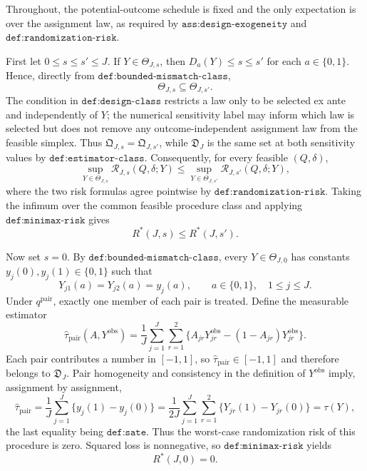 Throughout, the potential-outcome schedule is fixed and the only expectation is over the assignment law, as required by \(\texttt{ass:design-exogeneity}\) and \(\texttt{def:randomization-risk}\).

First let \(0\le s\le s'\le J\).  If \(Y\in\Theta_{J,s}\), then \(D_a(Y)\le s\le s'\) for each \(a\in\{0,1\}\).  Hence, directly from \(\texttt{def:bounded-mismatch-class}\),
\[
 \Theta_{J,s}\subseteq\Theta_{J,s'}.
\]
The condition in \(\texttt{def:design-class}\) restricts a law only to be selected ex ante and independently of \(Y\); the numerical sensitivity label may inform which law is selected but does not remove any outcome-independent assignment law from the feasible simplex.  Thus \(\mathfrak Q_{J,s}=\mathfrak Q_{J,s'}\), while \(\mathfrak D_J\) is the same set at both sensitivity values by \(\texttt{def:estimator-class}\).  Consequently, for every feasible \((Q,\delta)\),
\[
 \sup_{Y\in\Theta_{J,s}}\mathcal R_{J,s}(Q,\delta;Y)
 \le
 \sup_{Y\in\Theta_{J,s'}}\mathcal R_{J,s'}(Q,\delta;Y),
\]
where the two risk formulas agree pointwise by \(\texttt{def:randomization-risk}\).  Taking the infimum over the common feasible procedure class and applying \(\texttt{def:minimax-risk}\) gives
\[
 R^*(J,s)\le R^*(J,s').
\]

Now set \(s=0\).  By \(\texttt{def:bounded-mismatch-class}\), every \(Y\in\Theta_{J,0}\) has constants \(y_j(0),y_j(1)\in\{0,1\}\) such that
\[
 Y_{j1}(a)=Y_{j2}(a)=y_j(a),
 \qquad a\in\{0,1\},\quad 1\le j\le J.
\]
Under \(q^{\mathrm{pair}}\), exactly one member of each pair is treated.  Define the measurable estimator
\[
 \widehat\tau_{\mathrm{pair}}(A,Y^{\mathrm{obs}})
 =\frac1J\sum_{j=1}^J\sum_{r=1}^2
 \bigl\{A_{jr}Y^{\mathrm{obs}}_{jr}-(1-A_{jr})Y^{\mathrm{obs}}_{jr}\bigr\}.
\]
Each pair contributes a number in \([-1,1]\), so \(\widehat\tau_{\mathrm{pair}}\in[-1,1]\) and therefore belongs to \(\mathfrak D_J\).  Pair homogeneity and consistency in the definition of \(Y^{\mathrm{obs}}\) imply, assignment by assignment,
\[
 \widehat\tau_{\mathrm{pair}}
 =\frac1J\sum_{j=1}^J\{y_j(1)-y_j(0)\}
 =\frac1{2J}\sum_{j=1}^J\sum_{r=1}^2
 \{Y_{jr}(1)-Y_{jr}(0)\}
 =\tau(Y),
\]
the last equality being \(\texttt{def:sate}\).  Thus the worst-case randomization risk of this procedure is zero.  Squared loss is nonnegative, so \(\texttt{def:minimax-risk}\) yields
\[
 R^*(J,0)=0.
\]

